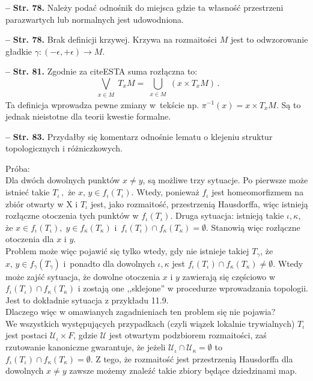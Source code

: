 \documentclass[a4paper,11pt]{article}
\newcommand{\mc}{\mathcal}
\newcommand{\ti}{\times}
\newcommand{\tb}{\textbf}
\newcommand{\noi}{\noindent}
\newcommand{\start}{\noi \tb{--} {}}
\newcommand{\Str}[1]{\tb{Str. #1.}}
\begin{document}
\start \Str{78} Należy podać odnośnik do miejsca gdzie ta własność
przestrzeni parazwartych lub normalnych jest udowodniona.

\start \Str{78} Brak definicji krzywej. Krzywa na rozmaitości $M$ jest
to odwzorowanie gładkie
$\gamma : ( - \epsilon, + \epsilon ) \rightarrow M$.

\start \Str{81} Zgodnie za cite{ESTA} suma rozłączna to:
\begin{displaymath}
  \bigvee_{ \substack{ x \in M } } T_{ x } M
  = \bigcup_{ \substack{ x \in M } }( x \times T_{ x } M ) \, .
\end{displaymath}
Ta definicja wprowadza pewne zmiany w~tekście np.
$\pi^{ -1 }( x ) = x \times T_{ x }M$. Są to jednak nieistotne dla
teorii kwestie formalne.

\start \Str{83} Przydałby się komentarz odnośnie lematu o klejeniu
struktur topologicznych i różniczkowych.

Próba: \\
Dla dwóch dowolnych punktów $x \neq y$, są możliwe trzy sytuacje. Po
pierwsze może istnieć takie $T_{ \iota } \, ,$ że
$x, \, y \in f_{ \iota }( T_{ \iota } )$. Wtedy, ponieważ
$f_{ \iota }$ jest homeomorfizmem na zbiór otwarty w X i $T_{ \iota }$
jest, jako rozmaitość, przestrzenią Hausdorffa, więc istnieją
rozłączne otoczenia tych punktów w $f_{ \iota } ( T_{ \iota } )$.
Druga sytuacja: istnieją takie $\iota, \kappa$, że
$x \in f_{ \iota } ( T_{ \iota } ), \; y \in f_{ \kappa } ( T_{ \kappa
} )$
i~$f_{ \iota } ( T_{ \iota } ) \cap f_{ \kappa } ( T_{ \kappa } ) =
\emptyset$.
Stanowią więc rozłączne otoczenia dla $x$ i $y$. \\
Problem może więc pojawić się tylko wtedy, gdy nie istnieje takiej
$T_{ \gamma }$, że $x, \, y \in f_{ \gamma }( T_{ \gamma } )$
i~ponadto dla dowolnych $\iota, \kappa$ jest
$f_{ \iota } ( T_{ \iota } ) \cap f_{ \kappa } ( T_{ \kappa } ) \neq
\emptyset$. Wtedy może zajść sytuacja, że dowolne otoczenia $x$ i $y$
zawierają się częściowo w
$f_{ \iota } ( T_{ \iota } ) \cap f_{ \kappa } ( T_{ \kappa } )$ i
zostają one ,,sklejone'' w procedurze wprowadzania topologii. Jest to
dokładnie sytuacja z
przykładu 11.9.\\
Dlaczego więc w omawianych zagadnieniach ten problem się nie
pojawia?\\ We wszystkich występujących przypadkach (czyli wiązek
lokalnie trywialnych) $T_{ \iota }$ jest postaci
$\mc{ U }_{ \iota } \ti F$, gdzie $\mc{ U }$ jest otwartym podzbiorem
rozmaitości, zaś rzutowanie kanoniczne gwarantuje, że jeżeli
$\mc{ U }_{ \iota } \cap \mc{ U }_{ \kappa } = \emptyset$ to
$f_{ \iota } (T_{ \iota }) \cap f_{ \kappa }(T_{ \kappa }) =
\emptyset$. Z tego, że rozmaitość jest przestrzenią Hausdorffa dla
dowolnych $x \neq y$ zawsze możemy znaleźć takie zbiory będące
dziedzinami map.
\end{document}
